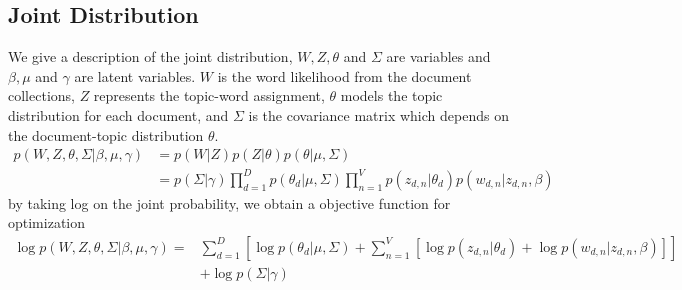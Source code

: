 \subsection{Joint Distribution}
We give a description of the joint distribution, $ W,Z,\theta $ and $ \Sigma $ are variables and $ \beta, \mu $ and $ \gamma $ are latent variables. $ W $ is the word likelihood from the document collections, $ Z $ represents the topic-word assignment, $ \theta $ models the topic distribution for each document, and $ \Sigma $ is the covariance matrix which depends on the document-topic distribution $ \theta $.
\begin{align*}
p(W,Z,\theta,\Sigma|\beta,\mu,\gamma)&=p(W|Z)p(Z|\theta)p(\theta|\mu,\Sigma)\\
&=p(\Sigma|\gamma)\prod_{d=1}^{D}p(\theta_d|\mu,\Sigma)\prod_{n=1}^{V}p(z_{d,n}|\theta_d)p(w_{d,n}|z_{d,n},\beta)
\end{align*}
by taking  log on the joint probability, we obtain a objective function for optimization
\begin{align*}
\log p(W,Z,\theta,\Sigma|\beta,\mu,\gamma)=&\sum_{d=1}^{D}\left[\log p(\theta_d|\mu,\Sigma)+\sum_{n=1}^{V}\left[\log p(z_{d,n}|\theta_d)+\log p(w_{d,n}|z_{d,n},\beta)\right]\right]\\
&+\log p(\Sigma|\gamma)
\end{align*}